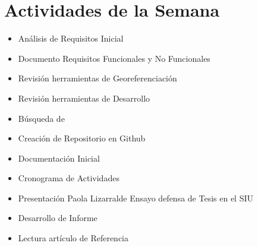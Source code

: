 \section{Actividades de la Semana}


\begin{itemize}

\item Análisis de Requisitos Inicial

\item Documento Requisitos Funcionales y No Funcionales

\item Revisión herramientas de Georeferenciación

\item Revisión herramientas de Desarrollo 

\item Búsqueda de 

\item Creación de Repositorio en Github

\item Documentación Inicial

\item Cronograma de Actividades

\item Presentación Paola Lizarralde Ensayo defensa de Tesis en el SIU

\item Desarrollo de Informe

\item Lectura artículo de Referencia\cite{scavuzzoalgoritmos}

\end{itemize}
